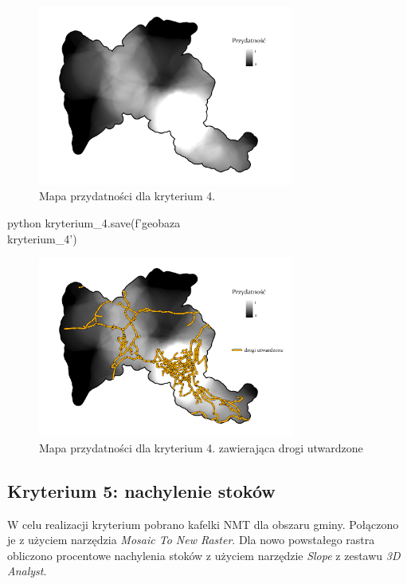 \documentclass{article}
\begin{document}
\begin{figure}[H]
    \centering
    \includegraphics[width=0.75\textwidth]{img/kryterium4-layout.jpg}
    \caption{Mapa przydatności dla kryterium 4.}
\end{figure}

\begin{mintedbox}{python}
kryterium_4.save(f'{geobaza}\\kryterium_4')
\end{mintedbox}

\begin{figure}[H]
    \centering
    \includegraphics[width=0.75\textwidth]{img/kryterium4-drogi.jpg}
    \caption{Mapa przydatności dla kryterium 4. zawierająca drogi utwardzone}
\end{figure}
\vspace{10pt}

\subsection{Kryterium 5: nachylenie stoków}
W celu realizacji kryterium pobrano kafelki NMT dla obszaru gminy. Połączono je z użyciem narzędzia \textit{Mosaic To New Raster}. Dla nowo powstałego rastra obliczono procentowe nachylenia stoków z użyciem narzędzie \textit{Slope} z zestawu \textit{3D Analyst}.
\vspace{5pt}
\end{document}
